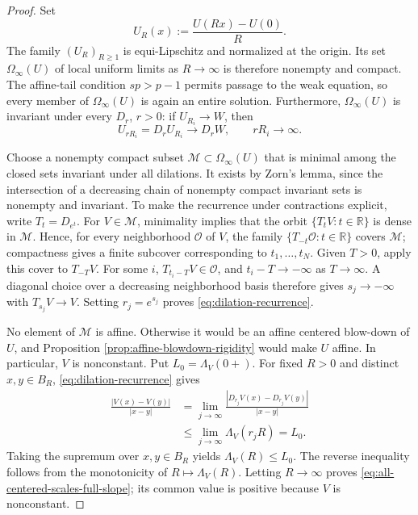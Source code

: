 \documentclass[11pt,reqno]{amsart}
\numberwithin{equation}{section}
\newcommand{\R}{\mathbb R}
\theoremstyle{remark}
\begin{document}
\begin{proof}
Set
\[
 U_R(x):=\frac{U(Rx)-U(0)}R.
\]
The family $(U_R)_{R\ge1}$ is equi-Lipschitz and normalized at the origin.
Its set $\Omega_\infty(U)$ of local uniform limits as $R\to\infty$ is
therefore nonempty and compact.  The affine-tail condition
$sp>p-1$ permits passage to the weak equation, so every member of
$\Omega_\infty(U)$ is again an entire solution.  Furthermore,
$\Omega_\infty(U)$ is invariant under every $D_r$, $r>0$: if
$U_{R_i}\to W$, then
\[
 U_{rR_i}=D_rU_{R_i}\longrightarrow D_rW,
 \qquad rR_i\longrightarrow\infty.
\]

Choose a nonempty compact subset $\mathscr M\subset\Omega_\infty(U)$
that is minimal among the closed sets invariant under all dilations.  It
exists by Zorn's lemma, since the intersection of a decreasing chain of
nonempty compact invariant sets is nonempty and invariant.  To make the
recurrence under contractions explicit, write \(T_t=D_{e^t}\).  For
\(V\in\mathscr M\), minimality implies that the orbit
\(\{T_tV:t\in\R\}\) is dense in \(\mathscr M\).  Hence, for every
neighborhood \(\mathcal O\) of \(V\), the family
\(\{T_{-t}\mathcal O:t\in\R\}\) covers \(\mathscr M\); compactness gives a
finite subcover corresponding to \(t_1,\ldots,t_N\).  Given \(T>0\),
apply this cover to \(T_{-T}V\).  For some \(i\),
\(T_{t_i-T}V\in\mathcal O\), and \(t_i-T\to-\infty\) as
\(T\to\infty\).  A diagonal choice over a decreasing neighborhood basis
therefore gives \(s_j\to-\infty\) with \(T_{s_j}V\to V\).  Setting
\(r_j=e^{s_j}\) proves \eqref{eq:dilation-recurrence}.

No element of $\mathscr M$ is affine.  Otherwise it would be an affine
centered blow-down of $U$, and Proposition
\ref{prop:affine-blowdown-rigidity} would make $U$ affine.  In
particular, $V$ is nonconstant.  Put
$L_0=\Lambda_V(0+)$.  For fixed $R>0$ and distinct $x,y\in B_R$,
\eqref{eq:dilation-recurrence} gives
\begin{align*}
 \frac{|V(x)-V(y)|}{|x-y|}
 &=\lim_{j\to\infty}
 \frac{|D_{r_j}V(x)-D_{r_j}V(y)|}{|x-y|}\\
 &\le\lim_{j\to\infty}\Lambda_V(r_jR)=L_0.
\end{align*}
Taking the supremum over $x,y\in B_R$ yields
$\Lambda_V(R)\le L_0$.  The reverse inequality follows from the monotonicity
of $R\mapsto\Lambda_V(R)$.  Letting $R\to\infty$ proves
\eqref{eq:all-centered-scales-full-slope}; its common value is positive
because $V$ is nonconstant.


\end{proof}
\end{document}
